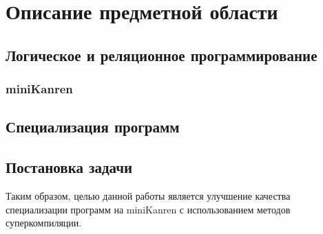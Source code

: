 \section{Описание предметной области}

\subsection{Логическое и реляционное программирование}





\subsubsection{miniKanren}



\subsection{Специализация программ}



\subsection{Постановка задачи}


Таким образом, целью данной работы является улучшение качества специализации
программ на miniKanren с использованием методов суперкомпиляции.
